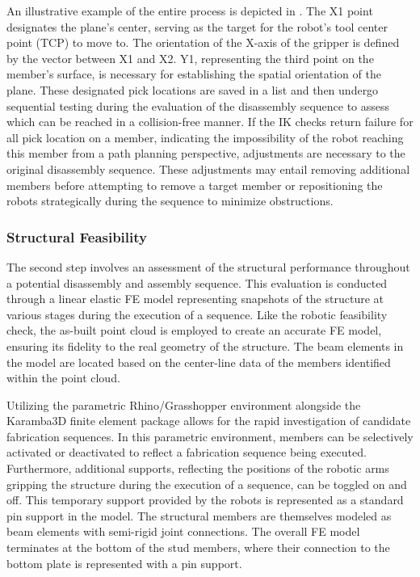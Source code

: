         An illustrative example of the entire process is depicted in . The X1 point designates the plane's center, serving as the target for the robot's tool center point (TCP) to move to. The orientation of the X-axis of the gripper is defined by the vector between X1 and X2. Y1, representing the third point on the member's surface, is necessary for establishing the spatial orientation of the plane. These designated pick locations are saved in a list and then undergo sequential testing during the evaluation of the disassembly sequence to assess which can be reached in a collision-free manner. If the IK checks return failure for all pick location on a member, indicating the impossibility of the robot reaching this member from a path planning perspective, adjustments are necessary to the original disassembly sequence. These adjustments may entail removing additional members before attempting to remove a target member or repositioning the robots strategically during the sequence to minimize obstructions.

    \subsubsection{Structural Feasibility}
        The second step involves an assessment of the structural performance throughout a potential disassembly and assembly sequence. This evaluation is conducted through a linear elastic FE model representing snapshots of the structure at various stages during the execution of a sequence. Like the robotic feasibility check, the as-built point cloud is employed to create an accurate FE model, ensuring its fidelity to the real geometry of the structure. The beam elements in the model are located based on the center-line data of the members identified within the point cloud.
        
        Utilizing the parametric Rhino/Grasshopper environment alongside the Karamba3D finite element package \citep{rutten_grasshopper_2007, preisinger_karambatoolkit_2014} allows for the rapid investigation of candidate fabrication sequences. In this parametric environment, members can be selectively activated or deactivated to reflect  a fabrication sequence being executed. Furthermore, additional supports, reflecting the positions of the robotic arms gripping the structure during the execution of a sequence, can be toggled on and off. This temporary support provided by the robots is represented as a standard pin support in the model. The structural members are themselves modeled as beam elements with semi-rigid joint connections. The overall FE model terminates at the bottom of the stud members, where their connection to the bottom plate is represented with a pin support.

